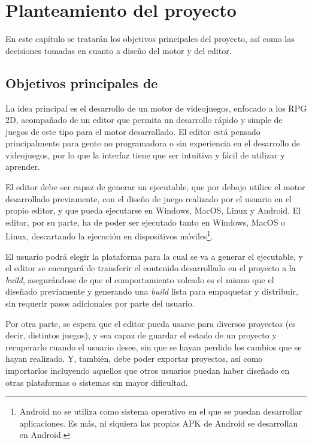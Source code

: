 \chapter{Planteamiento del proyecto}
\label{cap:planteamiento}



\begin{resumen}
En este capítulo se tratarán los objetivos principales del proyecto, así como las decisiones tomadas en cuanto a diseño del motor y del editor.
\end{resumen}

\section{Objetivos principales de \baker}
La idea principal es el desarrollo de un motor de videojuegos, enfocado a los RPG 2D, acompañado de un editor que permita un desarrollo rápido y simple de juegos de este tipo para el motor desarrollado. El editor está pensado principalmente para gente no programadora o sin experiencia en el desarrollo de videojuegos, por lo que la interfaz tiene que ser intuitiva y fácil de utilizar y aprender.

\smallskip

El editor debe ser capaz de generar un ejecutable, que por debajo utilice el motor desarrollado previamente, con el diseño de juego realizado por el usuario en el propio editor, y que pueda ejecutarse en Windows, MacOS, Linux y Android. El editor, por su parte, ha de poder ser ejecutado tanto en Windows, MacOS o Linux, descartando la ejecución en dispositivos móviles\footnote{Android no se utiliza como sistema operativo en el que se puedan desarrollar aplicaciones. Es más, ni siquiera las propias APK de Android se desarrollan en Android.}.

\smallskip

El usuario podrá elegir la plataforma para la cual se va a generar el ejecutable, y el editor se encargará de transferir el contenido desarrollado en el proyecto a la \textit{build}, asegurándose de que el comportamiento volcado es el mismo que el diseñado previamente y generando una \textit{build} lista para empaquetar y distribuir, sin requerir pasos adicionales por parte del usuario.

\medskip

Por otra parte, se espera que el editor pueda usarse para diversos proyectos (es decir, distintos juegos), y sea capaz de guardar el estado de un proyecto y recuperarlo cuando el usuario desee, sin que se hayan perdido los cambios que se hayan realizado. Y, también, debe poder exportar proyectos, así como importarlos incluyendo aquellos que otros usuarios puedan haber diseñado en otras plataformas o sistemas sin mayor dificultad.

